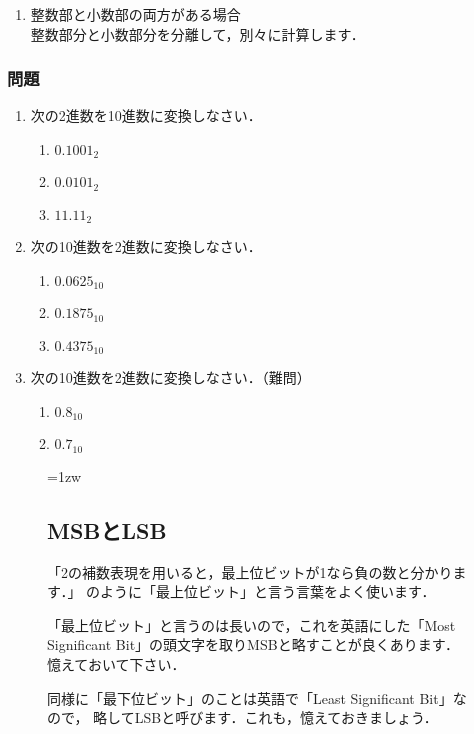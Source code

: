 \begin{enumerate}
\item 整数部と小数部の両方がある場合 \\
整数部分と小数部分を分離して，別々に計算します．
\end{enumerate}

\subsubsection{問題}
\begin{enumerate}
\item 次の2進数を10進数に変換しなさい．
\begin{enumerate}
\item $0.1001_2$
\item $0.0101_2$
\item $11.11_2$
\end{enumerate}

\item 次の10進数を2進数に変換しなさい．
\begin{enumerate}
\item $0.0625_{10}$
\item $0.1875_{10}$
\item $0.4375_{10}$
\end{enumerate}

\item 次の10進数を2進数に変換しなさい．（難問）
\begin{enumerate}
\item $0.8_{10}$
\item $0.7_{10}$
\end{enumerate}
\end{enumerate}

\begin{figure}[tbp]
\begin{framed}{\parindent=1zw
\subsection*{MSBとLSB}
「2の補数表現を用いると，最上位ビットが1なら負の数と分かります．」
のように「最上位ビット」と言う言葉をよく使います．

「最上位ビット」と言うのは長いので，これを英語にした「Most Significant
Bit」の頭文字を取りMSBと略すことが良くあります．憶えておいて下さい．

同様に「最下位ビット」のことは英語で「Least Significant Bit」なので，
略してLSBと呼びます．これも，憶えておきましょう．
}\end{framed}
\end{figure}


